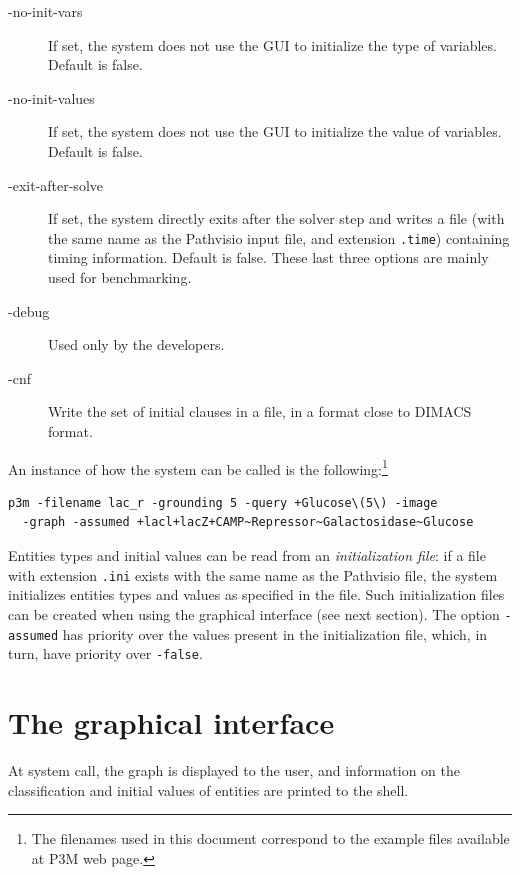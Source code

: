 \documentclass[a4paper]{article}
\renewcommand{\red}[1]{#1}
\begin{document}
\begin{description}
\item[-no-init-vars] If set, the system does not use the GUI to
  initialize the type of variables. Default is false. 

\item[-no-init-values] If set, the system does not use the GUI to
  initialize the value of variables. Default is false. 

\item[-exit-after-solve] If set, the system directly exits after the
  solver step and writes  a  file (with the same name as the Pathvisio
  input file,  and extension {\tt .time}) containing  timing
  information. Default is false. These last three options are mainly
  used for benchmarking. 

\item[-debug] Used only by the developers.

\item[-cnf] Write the set of initial clauses in a file, in a format close to DIMACS format.
\end{description}

An instance of how the system can be called is the
following:\footnote{\red{The filenames used in this document
    correspond to the example files available at P3M web page.}}
\begin{verbatim}
p3m -filename lac_r -grounding 5 -query +Glucose\(5\) -image
  -graph -assumed +lacl+lacZ+CAMP~Repressor~Galactosidase~Glucose
\end{verbatim}

Entities types and initial values can be read from an {\em initialization file}: if a file
with extension {\tt .ini} exists with the same name as the Pathvisio
file, the system initializes entities types and values as specified
in the file. Such initialization files can be created when using the
graphical interface (see next section). The option {\tt -assumed} has priority
over the values present in the initialization file, which, in turn, 
have priority over {\tt -false}.

\section{The graphical interface}

At system call, the graph is displayed to the user, and information on
the classification and initial values of entities are printed to the
shell. %
\end{document}

